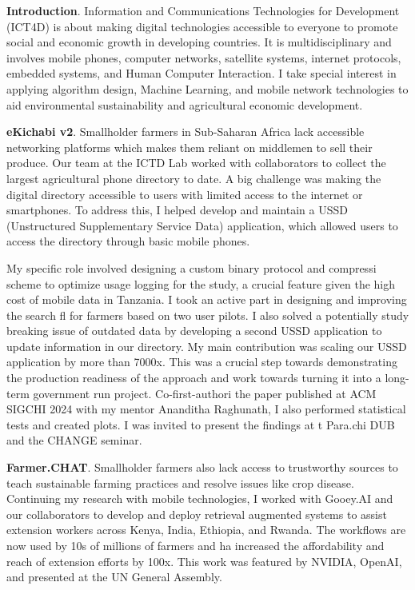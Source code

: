 \documentclass{article}
\title{\StrSubstitute{\jobname}{"}{}}
\author{Alexander Metzger}
\date{}
\begin{document}
\maketitle

\textbf{Introduction}. Information and Communications Technologies for Development
(ICT4D) is about making digital technologies accessible to everyone to promote social and
economic growth in developing countries. It is multidisciplinary and involves mobile
phones, computer networks, satellite systems, internet protocols, embedded systems, and
Human Computer Interaction. I take special interest in applying algorithm design, Machine
Learning, and mobile network technologies to aid environmental sustainability and
agricultural economic development.

\textbf{eKichabi v2}. Smallholder farmers in Sub-Saharan Africa lack accessible networking
platforms which makes them reliant on middlemen to sell their produce. Our team at the
ICTD Lab worked with collaborators to collect the largest agricultural phone directory to
date. A big challenge was making the digital directory accessible to users with limited
access to the internet or smartphones. To address this, I helped develop and maintain a
USSD (Unstructured Supplementary Service Data) application, which allowed users to
access the directory through basic mobile phones.

My specific role involved designing a custom binary protocol and compressi
scheme to optimize usage logging for the study, a crucial feature given the high cost of
mobile data in Tanzania. I took an active part in designing and improving the search fl
for farmers based on two user pilots. I also solved a potentially study breaking issue of
outdated data by developing a second USSD application to update information in our
directory. My main contribution was scaling our USSD application by more than 7000x.
This was a crucial step towards demonstrating the production readiness of the approach
and work towards turning it into a long-term government run project. Co-first-authori
the paper published at ACM SIGCHI 2024 with my mentor Ananditha Raghunath, I also
performed statistical tests and created plots. I was invited to present the findings at t
Para.chi DUB and the CHANGE seminar.

\textbf{Farmer.CHAT}. Smallholder farmers also lack access to trustworthy sources to teach
sustainable farming practices and resolve issues like crop disease. Continuing my research
with mobile technologies, I worked with Gooey.AI and our collaborators to develop and
deploy retrieval augmented systems to assist extension workers across Kenya, India,
Ethiopia, and Rwanda. The workflows are now used by 10s of millions of farmers and ha
increased the affordability and reach of extension efforts by 100x. This work was featured
by NVIDIA, OpenAI, and presented at the UN General Assembly.
\end{document}
